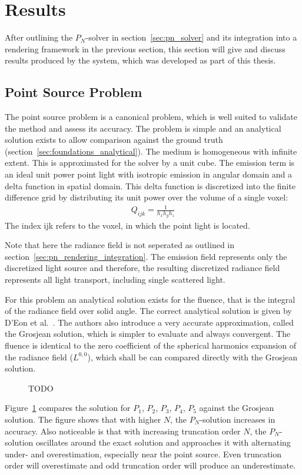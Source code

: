 \section{Results}
\label{sec:pn_results}

After outlining the $P_N$-solver in section~\ref{sec:pn_solver} and its integration into a rendering framework in the previous section, this section will give and discuss results produced by the system, which was developed as part of this thesis.

\subsection{Point Source Problem}
\label{sec:pn_results_pointsource}

The point source problem is a canonical problem, which is well suited to validate the method and assess its accuracy. The problem is simple and an analytical solution exists to allow comparison against the ground truth (section~\ref{sec:foundations_analytical}). The medium is homogeneous with infinite extent. This is approximated for the solver by a unit cube. The emission term is an ideal unit power point light with isotropic emission in angular domain and a delta function in spatial domain. This delta function is discretized into the finite difference grid by distributing its unit power over the volume of a single voxel:
\begin{align}
Q_{ijk} = \frac{1}{h_xh_yh_z}
\end{align}
The index {ijk} refers to the voxel, in which the point light is located.

Note that here the radiance field is not seperated as outlined in section~\ref{sec:pn_rendering_integration}. The emission field represents only the discretized light source and therefore, the resulting discretized radiance field represents all light transport, including single scattered light.

For this problem an analytical solution exists for the fluence, that is the integral of the radiance field over solid angle. The correct analytical solution is given by D'Eon et al.~\cite{dEon11}. The authors also introduce a very accurate approximation, called the Grosjean solution, which is simpler to evaluate and always convergent. The fluence is identical to the zero coefficient of the spherical harmonics expansion of the radiance field ($L^{0,0}$), which shall be can compared directly with the Grosjean solution.
\begin{figure}[h]
\centering
{}
\caption{TODO}
\label{fig:pn_results_pointsource_1}
\end{figure}
Figure~\ref{fig:pn_results_pointsource_1} compares the solution for $P_1$, $P_2$, $P_3$, $P_4$, $P_5$ against the Grosjean solution. The figure shows that with higher $N$, the $P_N$-solution increases in accuracy. Also noticeable is that with increasing truncation order $N$, the $P_N$-solution oscillates around the exact solution and approaches it with alternating under- and overestimation, especially near the point source. Even truncation order will overestimate and odd truncation order will produce an underestimate. 

